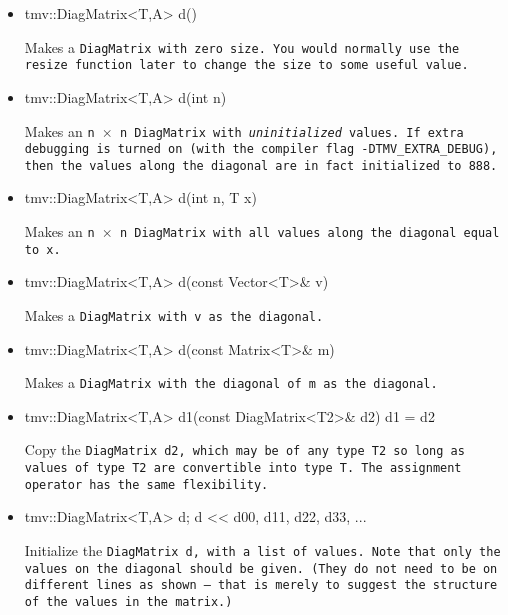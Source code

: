 \begin{itemize}

\item
\begin{tmvcode}
tmv::DiagMatrix<T,A> d()
\end{tmvcode}
Makes a \tt{DiagMatrix} with zero size.  You would normally use the \tt{resize} function later to
change the size to some useful value.

\item 
\begin{tmvcode}
tmv::DiagMatrix<T,A> d(int n)
\end{tmvcode}
Makes an \tt{n} $\times$ \tt{n} \tt{DiagMatrix} with {\em uninitialized} values.
If extra debugging is turned on (with the compiler flag \tt{-DTMV\_EXTRA\_DEBUG}), then the values along the diagonal are in fact initialized to 888. 

\item
\begin{tmvcode}
tmv::DiagMatrix<T,A> d(int n, T x)
\end{tmvcode}
Makes an \tt{n} $\times$ \tt{n} \tt{DiagMatrix} with all values along the diagonal equal to \tt{x}.

\item
\begin{tmvcode}
tmv::DiagMatrix<T,A> d(const Vector<T>& v)
\end{tmvcode}
Makes a \tt{DiagMatrix} with \tt{v} as the diagonal.

\item 
\begin{tmvcode}
tmv::DiagMatrix<T,A> d(const Matrix<T>& m)
\end{tmvcode}
Makes a \tt{DiagMatrix} with the diagonal of \tt{m} as the diagonal.

\item
\begin{tmvcode}
tmv::DiagMatrix<T,A> d1(const DiagMatrix<T2>& d2)
d1 = d2
\end{tmvcode}
Copy the \tt{DiagMatrix d2}, which may be of any type \tt{T2} so long
as values of type \tt{T2} are convertible into type \tt{T}.
The assignment operator has the same flexibility.

\item
\begin{tmvcode}
tmv::DiagMatrix<T,A> d;
d << d00,
         d11,
             d22,
                 d33, 
                     ...
\end{tmvcode}
Initialize the \tt{DiagMatrix d}, with a list of values.  Note that only the values on the diagonal should be given.  (They do not need to be on different lines as shown -- that is merely to suggest the structure of the values in the matrix.)


\end{itemize}
